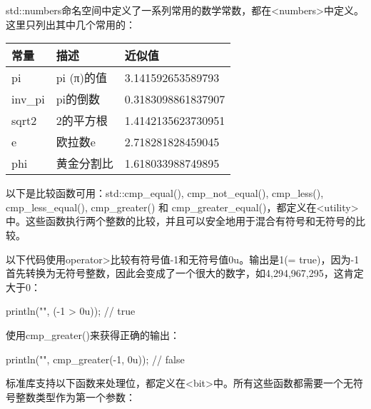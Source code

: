 std::numbers命名空间中定义了一系列常用的数学常数，都在<numbers>中定义。这里只列出其中几个常用的：

\begin{longtable}{|l|l|l|}
\hline
\textbf{常量} & \textbf{描述} & \textbf{近似值} \\ \hline
\endfirsthead
%
\endhead
%
pi                & pi (π)的值  & 3.141592653589793      \\ \hline
inv\_pi           & pi的倒数    & 0.3183098861837907     \\ \hline
sqrt2             & 2的平方根 & 1.4142135623730951     \\ \hline
e                 & 欧拉数e     & 2.718281828459045      \\ \hline
phi               & 黄金分割比     & 1.618033988749895      \\ \hline
\end{longtable}


以下是比较函数可用：std::cmp\_equal(), cmp\_not\_equal(), cmp\_less(), cmp\_less\_equal(), cmp\_greater() 和 cmp\_greater\_equal()，都定义在<utility>中。这些函数执行两个整数的比较，并且可以安全地用于混合有符号和无符号的比较。

以下代码使用operator>比较有符号值-1和无符号值0u。输出是1(= true)，因为-1首先转换为无符号整数，因此会变成了一个很大的数字，如4,294,967,295，这肯定大于0：

\begin{cpp}
println("{}", (-1 > 0u)); // true
\end{cpp}

使用cmp\_greater()来获得正确的输出：

\begin{cpp}
println("{}", cmp_greater(-1, 0u)); // false
\end{cpp}


标准库支持以下函数来处理位，都定义在<bit>中。所有这些函数都需要一个无符号整数类型作为第一个参数：

